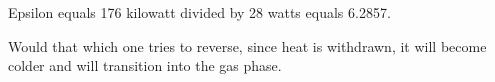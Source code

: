 Epsilon equals 176 kilowatt divided by 28 watts equals 6.2857.  

Would that which one tries to reverse, since heat is withdrawn, it will become colder and will transition into the gas phase.